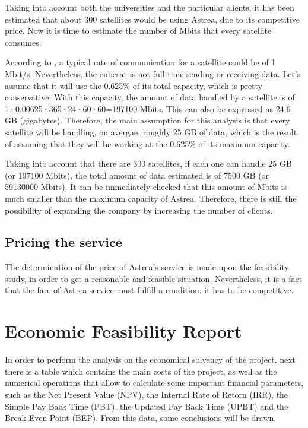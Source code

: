 Taking into account both the universities and the particular clients, it has been estimated that about 300 satellites would be using Astrea, due to its competitive price. Now it is time to estimate the number of Mbits that every satellite consumes.

According to \cite{GomSpace2016}, a typical rate of communication for a satellite could be of 1 Mbit/s. Nevertheless, the cubesat is not full-time sending or receiving data. Let's assume that it will use the 0.625\% of its total capacity, which is pretty conservative. With this capacity, the amount of data handled by a satellite is of 1·0.00625·365·24·60·60=197100 Mbits. This can also be expressed as 24.6 GB (gigabytes). Therefore, the main assumption for this analysis is that every satellite will be handling, on avergae, roughly 25 GB of data, which is the result of assuming that they will be working at the 0.625\% of its maximum capacity. 

Taking into account that there are 300 satellites, if each one can handle 25 GB (or 197100 Mbits), the total amount of data estimated is of 7500 GB (or 59130000 Mbits). It can be immediately checked that this amount of Mbits is much smaller than the maximum capacity of Astrea. Therefore, there is still the possibility of expanding the company by increasing the number of clients.  

\subsection{Pricing the service}
The determination of the price of Astrea's service is made upon the feasibility study, in order to get a reasonable and feasible situation. Nevertheless, it is a fact that the fare of Astrea service must fulfill a condition: it has to be competitive. 


\section{Economic Feasibility Report}

In order to perform the analysis on the economical solvency of the project, next there is a table which contains the main costs of the project, as well as the numerical operations that allow to calculate some important financial parameters, such as the Net Present Value (NPV), the Internal Rate of Retorn (IRR), the Simple Pay Back Time (PBT), the Updated Pay Back Time (UPBT) and the Break Even Point (BEP). From this data, some conclusions will be drawn.

